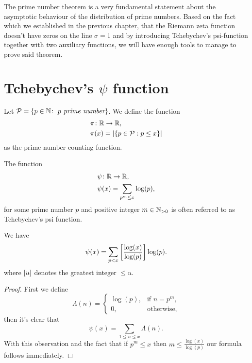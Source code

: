The prime number theorem is a very fundamental statement about the asymptotic behaviour of the distribution of prime numbers. Based on the fact which we established in the previous chapter, that the Riemann zeta function doesn't have zeros on the line $\sigma = 1$ and by introducing Tchebychev's psi-function together with two auxiliary functions, we will have enough tools to manage to prove said theorem.


\section{Tchebychev's $\psi$ function}


\begin{definition}
	Let $\mathcal{P} = \left\{p \in \mathbb{N} \colon \; p \textit{ prime number}\right\}$. We define the function
\begin{equation*}
\begin{aligned}
	&\pi \colon \mathbb{R} \to \mathbb{R}, \\
	&\pi(x) = \left|\left\{p \in \mathcal{P}: p \leq x\right\}\right|
\end{aligned}
\end{equation*}
	as the prime number counting function.
\end{definition}


\begin{definition}
	The function
\begin{equation*}
\begin{aligned}
	&\psi \colon \mathbb{R} \to \mathbb{R}, \\
	&\psi(x) = \sum _{p^m \leq x} \log(p),
\end{aligned}
\end{equation*}
	for some prime number $p$ and positive integer $m \in \mathbb{N}_{> 0}$ is often referred to as Tchebychev's psi function.
\end{definition}


\begin{lemma}
	We have
\begin{equation*}
	\psi(x) = \sum _{p < x} \left[\frac{\log(x)}{\log(p)}\right] \log(p).
\end{equation*}
	where $\left[u\right]$ denotes the greatest integer $\leq u$.
\end{lemma}
\begin{proof}
	First we define
\begin{equation*}
	\Lambda(n) =
    	\left\{
    		\begin{array}{ll}
        		\log(p), & \text{if } n = p^m,\\
        		0, & \text{otherwise},
        	\end{array}
		\right.
\end{equation*}
	then it's clear that
\begin{equation*}
	\psi(x) = \sum _{1 \leq n \leq x} \Lambda(n).
\end{equation*}
	With this observation and the fact that if $p^m \leq x$ then $m \leq \frac{\log(x)}{\log(p)}$ our formula follows immediately.
\end{proof}


